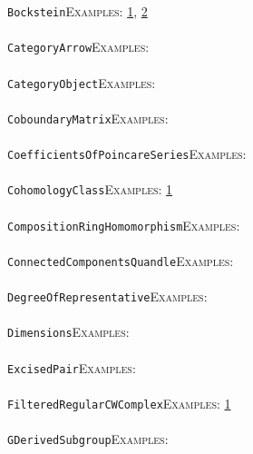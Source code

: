 \documentclass[a4paper,11pt]{report}
\begin{document}
{{ \texttt{Bockstein}{\nobreakspace}{\nobreakspace}{\nobreakspace}{\nobreakspace}\textsc{Examples:} \href{tutorial/chap7.html} {1}{\nobreakspace}, \href{../www/SideLinks/About/aboutModPRings.html} {2}{\nobreakspace} \\
 \\
 \texttt{CategoryArrow}{\nobreakspace}{\nobreakspace}{\nobreakspace}{\nobreakspace}\textsc{Examples:} \\
 \\
 \texttt{CategoryObject}{\nobreakspace}{\nobreakspace}{\nobreakspace}{\nobreakspace}\textsc{Examples:} \\
 \\
 \texttt{CoboundaryMatrix}{\nobreakspace}{\nobreakspace}{\nobreakspace}{\nobreakspace}\textsc{Examples:} \\
 \\
 \texttt{CoefficientsOfPoincareSeries}{\nobreakspace}{\nobreakspace}{\nobreakspace}{\nobreakspace}\textsc{Examples:} \\
 \\
 \texttt{CohomologyClass}{\nobreakspace}{\nobreakspace}{\nobreakspace}{\nobreakspace}\textsc{Examples:} \href{../www/SideLinks/About/aboutGouter.html} {1}{\nobreakspace} \\
 \\
 \texttt{CompositionRingHomomorphism}{\nobreakspace}{\nobreakspace}{\nobreakspace}{\nobreakspace}\textsc{Examples:} \\
 \\
 \texttt{ConnectedComponentsQuandle}{\nobreakspace}{\nobreakspace}{\nobreakspace}{\nobreakspace}\textsc{Examples:} \\
 \\
 \texttt{DegreeOfRepresentative}{\nobreakspace}{\nobreakspace}{\nobreakspace}{\nobreakspace}\textsc{Examples:} \\
 \\
 \texttt{Dimensions}{\nobreakspace}{\nobreakspace}{\nobreakspace}{\nobreakspace}\textsc{Examples:} \\
 \\
 \texttt{ExcisedPair}{\nobreakspace}{\nobreakspace}{\nobreakspace}{\nobreakspace}\textsc{Examples:} \\
 \\
 \texttt{FilteredRegularCWComplex}{\nobreakspace}{\nobreakspace}{\nobreakspace}{\nobreakspace}\textsc{Examples:} \href{tutorial/chap4.html} {1}{\nobreakspace} \\
 \\
 \texttt{GDerivedSubgroup}{\nobreakspace}{\nobreakspace}{\nobreakspace}{\nobreakspace}\textsc{Examples:} \\
}}
\end{document}
